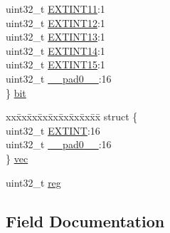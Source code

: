 \begin{DoxyCompactItemize}
\begin{tabbing}
\>uint32\_t \mbox{\hyperlink{union_e_i_c___i_n_t_e_n_c_l_r___type_a03290e3ff72e01e0ee53eeb147936f06}{EXTINT11}}:1\\
\>uint32\_t \mbox{\hyperlink{union_e_i_c___i_n_t_e_n_c_l_r___type_af93cdabb0c46c4d08aa37b6215b67b39}{EXTINT12}}:1\\
\>uint32\_t \mbox{\hyperlink{union_e_i_c___i_n_t_e_n_c_l_r___type_a6c321af7361840c15c12afdac2264958}{EXTINT13}}:1\\
\>uint32\_t \mbox{\hyperlink{union_e_i_c___i_n_t_e_n_c_l_r___type_a84fdb2f7b9284cb6a58430b20766b5a8}{EXTINT14}}:1\\
\>uint32\_t \mbox{\hyperlink{union_e_i_c___i_n_t_e_n_c_l_r___type_a16d393d8a9e76db59776627fb15fd64d}{EXTINT15}}:1\\
\>uint32\_t \mbox{\hyperlink{union_e_i_c___i_n_t_e_n_c_l_r___type_a3e57c2ef1c3ffb36722f000cc1156824}{\_\_pad0\_\_}}:16\\
\} \mbox{\hyperlink{union_e_i_c___i_n_t_e_n_c_l_r___type_a65a402b0a22c4b3931c5208bc4b755f8}{bit}}\\

\end{tabbing}\item 
\begin{tabbing}
xx\=xx\=xx\=xx\=xx\=xx\=xx\=xx\=xx\=\kill
struct \{\\
\>uint32\_t \mbox{\hyperlink{union_e_i_c___i_n_t_e_n_c_l_r___type_a24c42203572180be4d02864e17e3def2}{EXTINT}}:16\\
\>uint32\_t \mbox{\hyperlink{union_e_i_c___i_n_t_e_n_c_l_r___type_a3e57c2ef1c3ffb36722f000cc1156824}{\_\_pad0\_\_}}:16\\
\} \mbox{\hyperlink{union_e_i_c___i_n_t_e_n_c_l_r___type_a573b2fa080a312d8a3a669d6e1a5af45}{vec}}\\

\end{tabbing}\item 
uint32\+\_\+t \mbox{\hyperlink{union_e_i_c___i_n_t_e_n_c_l_r___type_a6b91636401516a477989a336376d7b40}{reg}}
\end{DoxyCompactItemize}


\subsection{Field Documentation}
\mbox{\label{union_e_i_c___i_n_t_e_n_c_l_r___type_a3e57c2ef1c3ffb36722f000cc1156824}} 
